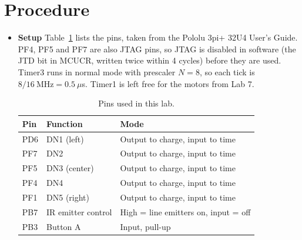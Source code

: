 \documentclass[11pt]{article}
\begin{document}
\section{Procedure}
\begin{itemize}

\item \textbf{Setup} Table~\ref{tab:pins} lists the pins, taken from the Pololu 3pi+ 32U4 User's Guide. PF4, PF5 and PF7 are also JTAG pins, so JTAG is disabled in software (the JTD bit in MCUCR, written twice within 4 cycles) before they are used. Timer3 runs in normal mode with prescaler $N = 8$, so each tick is $8 / 16~\text{MHz} = 0.5~\mu$s. Timer1 is left free for the motors from Lab 7.

\begin{table}[H]
  \centering
  \caption{Pins used in this lab.}
  \label{tab:pins}
  \begin{tabular}{lll}
    \toprule
    Pin & Function & Mode \\
    \midrule
    PD6 & DN1 (left) & Output to charge, input to time \\
    PF7 & DN2 & Output to charge, input to time \\
    PF5 & DN3 (center) & Output to charge, input to time \\
    PF4 & DN4 & Output to charge, input to time \\
    PF1 & DN5 (right) & Output to charge, input to time \\
    PB7 & IR emitter control & High = line emitters on, input = off \\
    PB3 & Button A & Input, pull-up \\
    \bottomrule
  \end{tabular}
\end{table}


\end{itemize}
\end{document}
